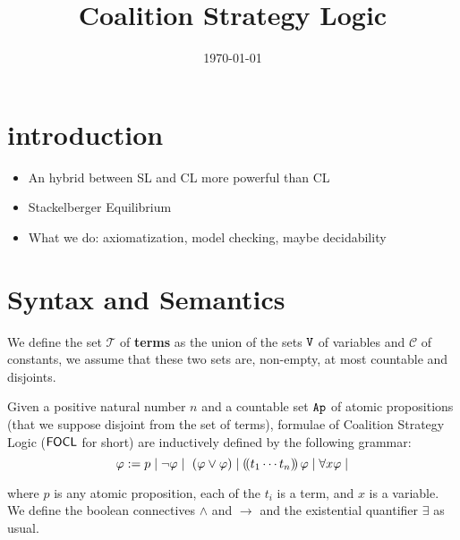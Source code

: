 \documentclass{article}
\title{Coalition Strategy Logic}
\date{\today}
\theoremstyle{definition}
\begin{document}
\maketitle

\section{introduction}
\begin{itemize}
    \item An hybrid between SL and CL more powerful than CL
    \item Stackelberger Equilibrium
    \item What we do: axiomatization, model checking, maybe decidability
    
\end{itemize}



\section{Syntax and Semantics}
We define the set $\mathcal{T}$ of \textbf{terms} as the union of the sets $\texttt{V}$ of variables and $\mathcal{C}$ of constants, we assume that these two sets are, non-empty, at most countable and disjoints.




Given a  positive natural number $n$  and a  countable set $\texttt{Ap}$  of atomic propositions (that we suppose disjoint from the set of terms), formulae of Coalition Strategy Logic ($\mathsf{FOCL}$ for short) are inductively defined by the following grammar: 
$$\varphi := p \mid \neg \varphi \mid \ (\varphi \vee \varphi) \mid (\!( t_1\cdots t_n )\!)\, \varphi  \mid \forall x \varphi\mid  $$

\noindent where $p$ is any atomic proposition, each of the $t_i$ is a term, and $x$ is a variable. We define the boolean connectives $\land$ and $\to$ and the existential quantifier $\exists$ as usual. 
\end{document}
